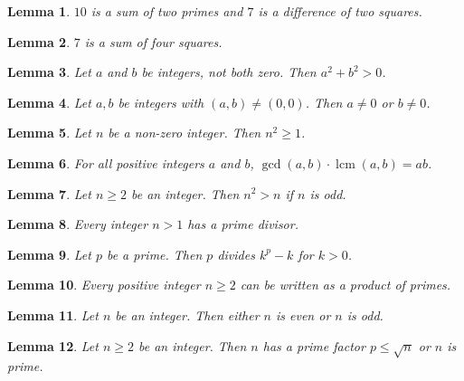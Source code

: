 \documentclass{article}
\newtheorem{lemma}{Lemma}
\begin{document}
\begin{lemma}\label{goldbach-ten}
$10$ is a sum of two primes and $7$ is a difference of two squares.
\end{lemma}

\begin{lemma}\label{lagrange-seven}
$7$ is a sum of four squares.
\end{lemma}

\begin{lemma}\label{not-both-zero}
Let $a$ and $b$ be integers, not both zero. Then $a^2+b^2>0$.
\end{lemma}

\begin{lemma}\label{pair-nonzero}
Let $a,b$ be integers with $(a,b)\neq(0,0)$. Then $a\neq0$ or $b\neq0$.
\end{lemma}

\begin{lemma}\label{non-zero}
Let $n$ be a non-zero integer. Then $n^2\ge1$.
\end{lemma}

\begin{lemma}\label{gcd-lcm}
For all positive integers $a$ and $b$, $\gcd(a,b)\cdot\operatorname{lcm}(a,b)=ab$.
\end{lemma}

\begin{lemma}\label{post-if}
Let $n\ge2$ be an integer. Then $n^2>n$ if $n$ is odd.
\end{lemma}

\begin{lemma}\label{every-has}
Every integer $n>1$ has a prime divisor.
\end{lemma}

\begin{lemma}\label{post-for}
Let $p$ be a prime. Then $p$ divides $k^p-k$ for $k>0$.
\end{lemma}

\begin{lemma}\label{written-as}
Every positive integer $n\ge2$ can be written as a product of primes.
\end{lemma}

\begin{lemma}\label{either-or}
Let $n$ be an integer. Then either $n$ is even or $n$ is odd.
\end{lemma}

\begin{lemma}\label{has-or}
Let $n\ge2$ be an integer. Then $n$ has a prime factor $p\le\sqrt{n}$ or $n$ is prime.
\end{lemma}
\end{document}
